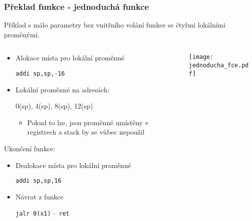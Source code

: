 \documentclass{beamer}
\begin{document}
\begin{frame}
\frametitle{Překlad funkce - jednoduchá funkce}

Příklad s málo parametry bez vnitřního volání funkce se čtyřmi lokálními proměnými.
\begin{columns}
\begin{column}{0.65\textwidth}
\begin{itemize}
 \item Alokace místa pro lokální proměnné 
 
 \texttt{addi  sp,sp,-16}
 \item Lokální proměnné na adresách: 
 
 0(sp), 4(sp), 8(sp), 12(sp)
\begin{itemize}
 \item Pokud to lze, jsou proměnné umístěny v registrech a stack by se vůbec nepoužil
\end{itemize}
\end{itemize}

Ukončení funkce:
\begin{itemize}
 \item Dealokace místa pro lokální proměnné 
 
 \texttt{addi  sp,sp,16}
 \item Návrat z funkce 
 
 \texttt{jalr 0(x1)} -- \texttt{ret} 
\end{itemize}
\end{column}
\begin{column}{0.35\textwidth}  
\texttt{[image: jednoducha\_fce.pdf]}
\end{column}
\end{columns}

\end{frame}
\end{document}
